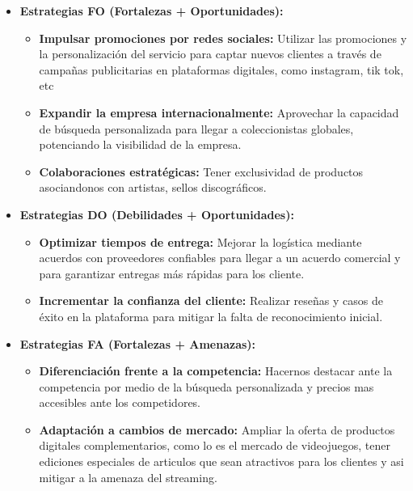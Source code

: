 \documentclass[12pt]{article}
\begin{document}
\begin{itemize}
	\item \textbf{Estrategias FO (Fortalezas + Oportunidades):} 

	\begin{itemize}
		\item \textbf{Impulsar promociones por redes sociales:} Utilizar las promociones y la personalización del servicio para captar nuevos clientes a través de campañas publicitarias en plataformas digitales, como instagram, tik tok, etc
		
		\item \textbf{Expandir la empresa internacionalmente:} Aprovechar la capacidad de búsqueda personalizada para llegar a coleccionistas globales, potenciando la visibilidad de la empresa.
		
		\item \textbf{Colaboraciones estratégicas:} Tener exclusividad de productos asociandonos con artistas, sellos discográficos.

	\end{itemize}

	\item \textbf{Estrategias DO (Debilidades + Oportunidades):}

	\begin{itemize}
		\item \textbf{Optimizar tiempos de entrega:} Mejorar la logística mediante acuerdos con proveedores confiables para llegar a un acuerdo comercial y para garantizar entregas más rápidas para los cliente.
		
		\item \textbf{Incrementar la confianza del cliente:} Realizar reseñas y casos de éxito en la plataforma para mitigar la falta de reconocimiento inicial.

	\end{itemize}

	\item \textbf{Estrategias FA (Fortalezas + Amenazas):}

	\begin{itemize}
		\item \textbf{Diferenciación frente a la competencia:} Hacernos destacar ante la competencia por medio de la búsqueda personalizada y precios mas accesibles ante los competidores.
		
		\item \textbf{Adaptación a cambios de mercado:} Ampliar la oferta de productos digitales complementarios, como lo es el mercado de videojuegos, tener ediciones especiales de articulos que sean atractivos para los clientes y asi mitigar a la amenaza del streaming.


\end{itemize}
\end{itemize}
\end{document}
